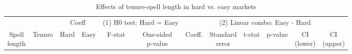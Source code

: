 \begin{table}[h!]
\footnotesize
\renewcommand{\arraystretch}{1.2}
\begin{center}
\caption{Effects of tenure-spell length in hard vs. easy markets}
\label{tab:lf_data_v_robustness}
\begin{tabular}{cccccccccccc}\toprule
& & \multicolumn{2}{c}{Coeff} & \multicolumn{2}{c}{(1) H0 test: Hard = Easy} & \multicolumn{6}{c}{(2) Linear combo: Easy - Hard}\\
\cmidrule(rl){3-4}\cmidrule(rl){5-6}\cmidrule(rl){7-12}
\makecell{Spell\\length} & Tenure & Hard & Easy & F-stat & \makecell{One-sided\\p-value} & Coeff. & \makecell{Standard\\error} & t-stat & p-value & \makecell{CI\\(lower)} & \makecell{CI\\(upper)}\\
\midrule

\end{tabular}
\end{center}
\end{table}
